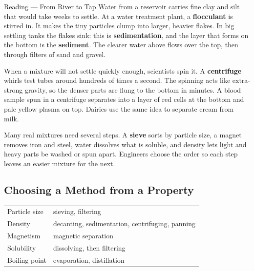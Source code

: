 \begin{readingbox}{Reading --- From River to Tap}
Water from a reservoir carries fine clay and silt that would take weeks to settle. At a water treatment plant, a \textbf{flocculant} is stirred in. It makes the tiny particles clump into larger, heavier flakes. In big settling tanks the flakes sink: this is \textbf{sedimentation}, and the layer that forms on the bottom is the \textbf{sediment}. The clearer water above flows over the top, then through filters of sand and gravel.

When a mixture will not settle quickly enough, scientists spin it. A \textbf{centrifuge} whirls test tubes around hundreds of times a second. The spinning acts like extra-strong gravity, so the denser parts are flung to the bottom in minutes. A blood sample spun in a centrifuge separates into a layer of red cells at the bottom and pale yellow plasma on top. Dairies use the same idea to separate cream from milk.

Many real mixtures need several steps. A \textbf{sieve} sorts by particle size, a magnet removes iron and steel, water dissolves what is soluble, and density lets light and heavy parts be washed or spun apart. Engineers choose the order so each step leaves an easier mixture for the next.
\end{readingbox}

\rcreset
{}

\label{theory:3}

\subsection{Choosing a Method from a Property}\label{sub:a3.1}

\begin{ctab}
\begin{tabular}{|W{3.6cm}|W{6.6cm}|}
  \hline{} &  \\ \hline
  Particle size & sieving, filtering \\ \hline
  Density & decanting, sedimentation, centrifuging, panning \\ \hline
  Magnetism & magnetic separation \\ \hline
  Solubility & dissolving, then filtering \\ \hline
  Boiling point & evaporation, distillation \\ \hline
\end{tabular}
\end{ctab}

